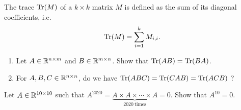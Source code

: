 \documentclass[11pt,nocut]{article}
\begin{document}
\begin{problem}[2 points]
	The trace ${{\rm Tr}}(M)$ of a $k \times k$ matrix $M$ is defined as the sum of its diagonal coefficients, i.e.
	$$
	{{\rm Tr}}(M) = \sum_{i=1}^k M_{i,i}.
	$$
	\begin{enumerate}[label=\normalfont(\textbf{\alph*})]
		\item Let $A \in \mathbb{R}^{n \times m}$ and $B \in \mathbb{R}^{m \times n}$. Show that ${{\rm Tr}}(AB) = {{\rm Tr}}(BA)$.
		\item For $A,B,C \in \mathbb{R}^{n \times n}$, do we have ${{\rm Tr}}(ABC) = {{\rm Tr}}(CAB) = {{\rm Tr}}(ACB)$ ?
	\end{enumerate}
\end{problem}

\vspace{5mm}

\begin{problem}[$\star$]
	Let $A \in \mathbb{R}^{10 \times 10}$ such that $A^{2020} = \underbrace{A \times A \times \cdots \times A}_{2020 \ \text{times}} = 0$. Show that $A^{10} = 0$.
\end{problem}



\vspace{1cm}
\centerline{}

%
%
\end{document}
